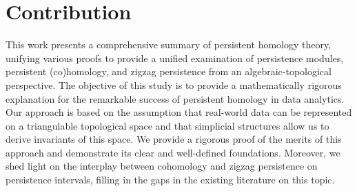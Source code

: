 \section{Contribution}
This work presents a comprehensive summary of persistent homology theory, unifying various proofs to provide a unified examination of persistence modules, persistent (co)homology, and zigzag persistence from an algebraic-topological perspective. The objective of this study is to provide a mathematically rigorous explanation for the remarkable success of persistent homology in data analytics. Our approach is based on the assumption that real-world data can be represented on a triangulable topological space and that simplicial structures allow us to derive invariants of this space. We provide a rigorous proof of the merits of this approach and demonstrate its clear and well-defined foundations. Moreover, we shed light on the interplay between cohomology and zigzag persistence on persistence intervals, filling in the gaps in the existing literature on this topic.